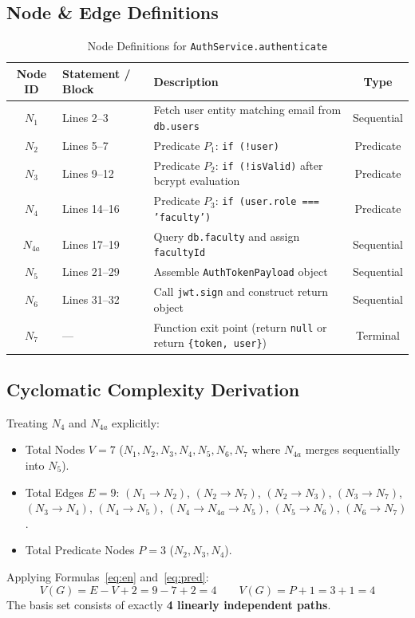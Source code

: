 \documentclass[11pt,a4paper]{article}
\begin{document}
\subsection{Node \& Edge Definitions}
\begin{table}[H]
\centering
\small
\begin{tabular}{@{}clp{8.5cm}c@{}}
\toprule
\textbf{Node ID} & \textbf{Statement / Block} & \textbf{Description} & \textbf{Type} \\ \midrule
$N_1$ & Lines 2--3 & Fetch user entity matching email from \texttt{db.users} & Sequential \\
$N_2$ & Lines 5--7 & Predicate $P_1$: \texttt{if (!user)} & Predicate \\
$N_3$ & Lines 9--12 & Predicate $P_2$: \texttt{if (!isValid)} after bcrypt evaluation & Predicate \\
$N_4$ & Lines 14--16 & Predicate $P_3$: \texttt{if (user.role === 'faculty')} & Predicate \\
$N_{4a}$ & Lines 17--19 & Query \texttt{db.faculty} and assign \texttt{facultyId} & Sequential \\
$N_5$ & Lines 21--29 & Assemble \texttt{AuthTokenPayload} object & Sequential \\
$N_6$ & Lines 31--32 & Call \texttt{jwt.sign} and construct return object & Sequential \\
$N_7$ & --- & Function exit point (return \texttt{null} or return \texttt{\{token, user\}}) & Terminal \\ \bottomrule
\end{tabular}
\caption{Node Definitions for \texttt{AuthService.authenticate}}
\end{table}

\subsection{Cyclomatic Complexity Derivation}
Treating $N_4$ and $N_{4a}$ explicitly:
\begin{itemize}
    \item Total Nodes $V = 7$ ($N_1, N_2, N_3, N_4, N_5, N_6, N_7$ where $N_{4a}$ merges sequentially into $N_5$).
    \item Total Edges $E = 9$:
    $(N_1 \to N_2)$, $(N_2 \to N_7)$, $(N_2 \to N_3)$, $(N_3 \to N_7)$, $(N_3 \to N_4)$, $(N_4 \to N_5)$, $(N_4 \to N_{4a} \to N_5)$, $(N_5 \to N_6)$, $(N_6 \to N_7)$.
    \item Total Predicate Nodes $P = 3$ ($N_2, N_3, N_4$).
\end{itemize}
Applying Formulas~\ref{eq:en} and~\ref{eq:pred}:
\[
V(G) = E - V + 2 = 9 - 7 + 2 = 4 \qquad V(G) = P + 1 = 3 + 1 = 4
\]
The basis set consists of exactly \textbf{4 linearly independent paths}.
\end{document}
